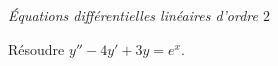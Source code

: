 \documentclass[a4paper,10pt]{report}
\begin{document}

\medskip

\begin{center}
\textit{{ {\large Équations différentielles linéaires d'ordre $2$}}}
\end{center}

\medskip

\begin{Exa} Résoudre $y''-4y'+3y=e^x$.
\end{Exa}
\end{document}
